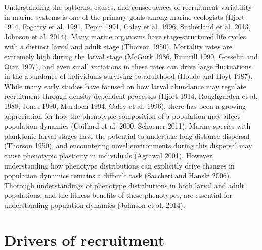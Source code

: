 \documentclass[]{book}
\begin{document}
Understanding the patterns, causes, and consequences of recruitment
variability in marine systems is one of the primary goals among marine
ecologists (Hjort 1914, Fogarty et al. 1991, Pepin 1991, Caley et al.
1996, Sutherland et al. 2013, Johnson et al. 2014). Many marine
organisms have stage-structured life cycles with a distinct larval and
adult stage (Thorson 1950). Mortality rates are extremely high during
the larval stage (McGurk 1986, Rumrill 1990, Gosselin and Qian 1997),
and even small variations in these rates can drive large fluctuations in
the abundance of individuals surviving to adulthood (Houde and Hoyt
1987). While many early studies have focused on how larval abundance may
regulate recruitment through density-dependent processes (Hjort 1914,
Roughgarden et al. 1988, Jones 1990, Murdoch 1994, Caley et al. 1996),
there has been a growing appreciation for how the phenotypic composition
of a population may affect population dynamics (Gaillard et al. 2000,
Schoener 2011). Marine species with planktonic larval stages have the
potential to undertake long distance dispersal (Thorson 1950), and
encountering novel environments during this dispersal may cause
phenotypic plasticity in individuals (Agrawal 2001). However,
understanding how phenotype distributions can explicitly drive changes
in population dynamics remains a difficult task (Saccheri and Hanski
2006). Thorough understandings of phenotype distributions in both larval
and adult populations, and the fitness benefits of these phenotypes, are
essential for understanding population dynamics (Johnson et al. 2014).

\section{Drivers of recruitment}\label{drivers-of-recruitment}
\end{document}
